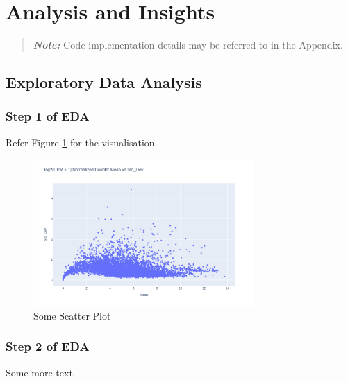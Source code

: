 \section{Analysis and Insights}

\begin{quote}
  \textit{\textbf{Note:}} Code implementation details may be referred to in the Appendix.
\end{quote}

\subsection{Exploratory Data Analysis}

\subsubsection{Step 1 of EDA}

Refer Figure \ref{fig:logcpm_scatter} for the visualisation. 

\begin{figure}[h!]
    \centering
    \includegraphics[width=0.75\textwidth]{figures/input/scatter_plot_mean_stddev_logcpm.png}
    \caption{Some Scatter Plot}
    \label{fig:logcpm_scatter}
\end{figure}


\subsubsection{Step 2 of EDA}

Some more text. 

\newpage




